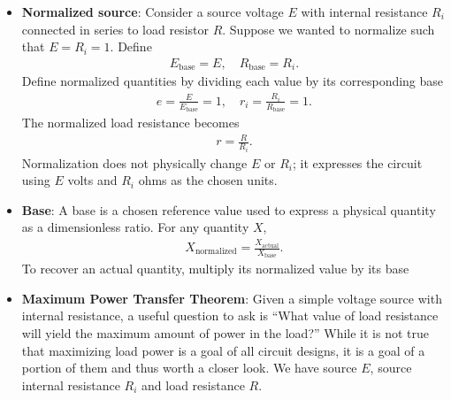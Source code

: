 \documentclass{report}
\begin{document}
\begin{itemize}
            \bigbreak \noindent 
            Perhaps the most useful thing to remember here is that if we can create a Thevenin equivalent for a network then it must be possible to create a Norton equivalent. Indeed, once a Thevenin equivalent is found, a source conversion can be performed on it to yield the Norton equivalent!
        \item \textbf{Normalized source}: Consider a source voltage $E$ with internal resistance $R_{i}$ connected in series to load resistor $R$. Suppose we wanted to normalize such that $E = R_{i} = 1$.
            \bigbreak \noindent 
            Define
            \begin{align*}
                E_{\text{base}} = E, \quad R_{\text{base}} = R_{i}
            .\end{align*}
            Define normalized quantities by dividing each value by its corresponding base
            \begin{align*}
                e = \frac{E}{E_{\text{base}}} = 1, \quad r_{i} = \frac{R_{i}}{R_{\text{base}}} = 1
            .\end{align*}
            The normalized load resistance becomes 
            \begin{align*}
                r = \frac{R}{R_{i}}
            .\end{align*}
            Normalization does not physically change \(E\) or \(R_i\); it expresses the circuit using \(E\) volts and \(R_i\) ohms as the chosen units.
        \item \textbf{Base}: A base is a chosen reference value used to express a physical quantity as a dimensionless ratio. 
            \bigbreak \noindent 
            For any quantity $X$,
            \begin{align*}
                X_{\text{normalized}} = \frac{X_{\text{actual}}}{X_{\text{base}}}
            .\end{align*}
            To recover an actual quantity, multiply its normalized value by its base
        \item \textbf{Maximum Power Transfer Theorem}: Given a simple voltage source with internal resistance, a useful question to ask is “What value of load resistance will yield the maximum amount of power in the load?” While it is not true that maximizing load power is a goal of all circuit designs, it is a goal of a portion of them and thus worth a closer look.
            \bigbreak \noindent 
            \bigbreak \noindent 
            We have source $E$, source internal resistance $R_{i}$ and load resistance $R$. 

\end{itemize}
\end{document}
